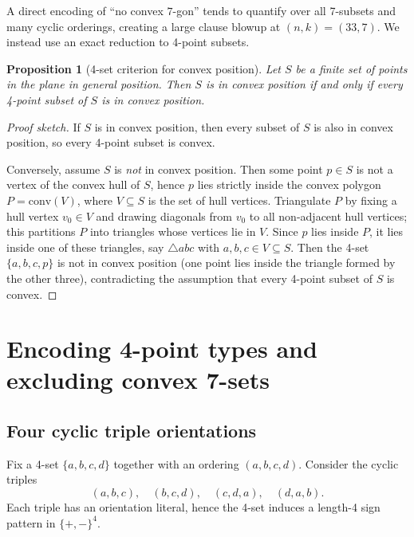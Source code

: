 \documentclass[11pt,a4paper]{article}
\newtheorem{proposition}{Proposition}
\theoremstyle{definition}
\begin{document}
A direct encoding of ``no convex $7$-gon'' tends to quantify over all 7-subsets and many cyclic orderings, creating a large clause blowup at $(n,k)=(33,7)$. We instead use an exact reduction to 4-point subsets.

\begin{proposition}[4-set criterion for convex position]\label{prop:4criterion}
Let $S$ be a finite set of points in the plane in general position.
Then $S$ is in convex position if and only if every 4-point subset of $S$ is in convex position.
\end{proposition}

\begin{proof}[Proof sketch]
If $S$ is in convex position, then every subset of $S$ is also in convex position, so every 4-point subset is convex.

Conversely, assume $S$ is \emph{not} in convex position. Then some point $p\in S$ is not a vertex of the convex hull of $S$, hence $p$ lies strictly inside the convex polygon $P=\mathrm{conv}(V)$, where $V\subseteq S$ is the set of hull vertices.
Triangulate $P$ by fixing a hull vertex $v_0\in V$ and drawing diagonals from $v_0$ to all non-adjacent hull vertices; this partitions $P$ into triangles whose vertices lie in $V$.
Since $p$ lies inside $P$, it lies inside one of these triangles, say $\triangle abc$ with $a,b,c\in V\subseteq S$.
Then the 4-set $\{a,b,c,p\}$ is not in convex position (one point lies inside the triangle formed by the other three), contradicting the assumption that every 4-point subset of $S$ is convex.
\end{proof}

\section{Encoding 4-point types and excluding convex 7-sets}

\subsection{Four cyclic triple orientations}

Fix a 4-set $\{a,b,c,d\}$ together with an ordering $(a,b,c,d)$. Consider the cyclic triples
\[
(a,b,c),\quad (b,c,d),\quad (c,d,a),\quad (d,a,b).
\]
Each triple has an orientation literal, hence the 4-set induces a length-4 sign pattern in $\{+,-\}^4$.
\end{document}
